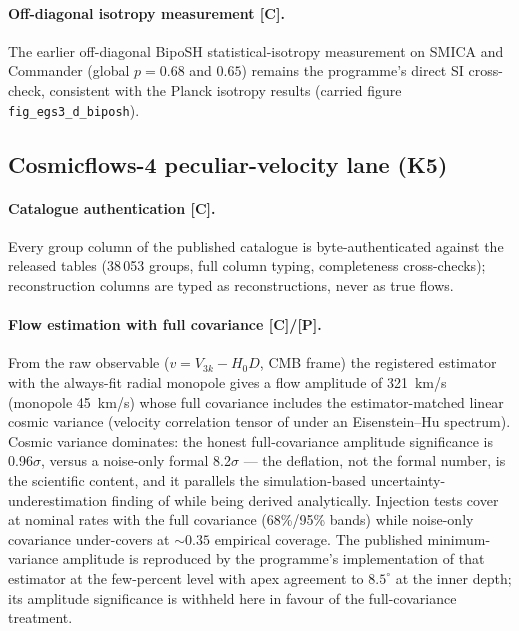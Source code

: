 \documentclass[10pt]{article}
\theoremstyle{definition}
\newcommand{\code}[1]{\texttt{\small #1}}
\newcommand{\tier}[1]{\textbf{[#1]}}
\begin{document}
\paragraph{Off-diagonal isotropy measurement \tier{C}.}
The earlier off-diagonal BipoSH statistical-isotropy measurement on
SMICA and Commander (global $p = 0.68$ and $0.65$) remains the
programme's direct SI cross-check, consistent with the Planck
isotropy results \cite{Planck2018VII} (carried figure
\code{fig\_egs3\_d\_biposh}).

\subsection{Cosmicflows-4 peculiar-velocity lane (K5)}
\label{sec:cf4}

\paragraph{Catalogue authentication \tier{C}.}
Every group column of the published catalogue \cite{Tully2023} is
byte-authenticated against the released tables (38\,053 groups, full
column typing, completeness cross-checks); reconstruction columns are
typed as reconstructions, never as true flows.

\paragraph{Flow estimation with full covariance \tier{C}/\tier{P}.}
From the raw observable ($v = V_{3k} - H_0 D$, CMB frame) the
registered estimator with the always-fit radial monopole gives a flow
amplitude of 321~km/s (monopole 45~km/s) whose full
covariance includes the estimator-matched linear cosmic variance
(velocity correlation tensor of \cite{Gorski1988} under an
Eisenstein--Hu spectrum). Cosmic variance dominates: the honest
full-covariance amplitude significance is 0.96$\sigma$,
versus a noise-only formal 8.2$\sigma$ --- the deflation,
not the formal number, is the scientific content, and it parallels the
simulation-based uncertainty-underestimation finding of
\cite{Whitford2023} while being derived analytically. Injection tests
cover at nominal rates with the full covariance (68\%/95\% bands)
while noise-only covariance under-covers at ${\sim}0.35$ empirical
coverage. The published minimum-variance amplitude
\cite{Watkins2023} is reproduced by the programme's implementation of
that estimator at the few-percent level with apex agreement to
$8.5^\circ$ at the inner depth; its amplitude significance is
withheld here in favour of the full-covariance treatment.
\end{document}
